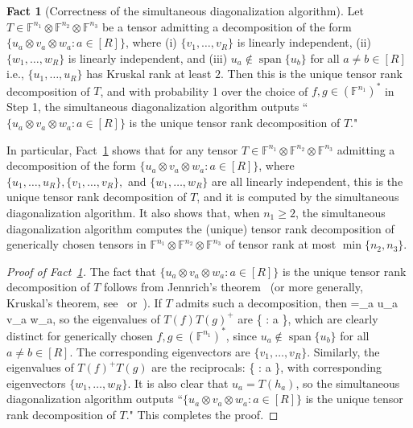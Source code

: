 \documentclass[11pt]{article}
\theoremstyle{definition}
\newtheorem{fact}[theorem]{Fact}
\newcommand{\field}{\mathbb{F}}
\newcommand\A{\mathcal{A}}
\DeclareMathOperator{\spn}{span}
\def\ba#1\ea{\begin{align}#1\end{align}}
\begin{document}
\begin{fact}[Correctness of the simultaneous diagonalization algorithm]\label{fact:jennrich}
Let $T \in \field^{n_1}\otimes \field^{n_2} \otimes \field^{n_3}$ be a tensor admitting a decomposition of the form $\{u_a \otimes v_a \otimes w_a : a \in [R]\}$, where (i) $\{v_1,\dots, v_R\}$ is linearly independent, (ii) $\{w_1,\dots, w_R\}$ is linearly independent, and (iii) $u_a \notin \spn\{u_b\}$ for all $a \neq b \in [R]$ i.e., $\{u_1, \dots, u_R\}$ has Kruskal rank at least $2$. Then this is the unique tensor rank decomposition of $T$, and with probability 1 over the choice of $f,g \in (\field^{n_1})^*$ in Step 1, the simultaneous diagonalization algorithm outputs ``$\{u_a \otimes v_a \otimes w_a : a \in [R]\}$ is the unique tensor rank decomposition of $T$."
\end{fact}
In particular, Fact~\ref{fact:jennrich} shows that for any tensor $T \in \field^{n_1}\otimes \field^{n_2} \otimes \field^{n_3}$ admitting a decomposition of the form $\{u_a \otimes v_a \otimes w_a : a \in [R]\}$, where $\{u_1,\dots, u_R\}, \{v_1,\dots,v_R\},$ and $\{w_1,\dots,w_R\}$ are all linearly independent, this is the unique tensor rank decomposition of $T$, and it is computed by the simultaneous diagonalization algorithm. It also shows that, when $n_1 \geq 2$, the simultaneous diagonalization algorithm computes the (unique) tensor rank decomposition of generically chosen tensors in $\field^{n_1}\otimes \field^{n_2} \otimes \field^{n_3}$ of tensor rank at most $\min\{n_2,n_3\}$.
\begin{proof}[Proof of Fact~\ref{fact:jennrich}]
The fact that $\{u_a \otimes v_a \otimes w_a : a \in [R]\}$ is the unique tensor rank decomposition of $T$ follows from Jennrich's theorem~\cite{harshman1970foundations, Har72} (or more generally, Kruskal's theorem, see~\cite{kruskal1977three} or~\cite{tensor}). If $T$ admits such a decomposition, then
\ba
T=\sum_{a\in [R]} u_a \otimes v_a \otimes w_a,
\ea
so the eigenvalues of $T(f) T(g)^{+}$ are
\ba
\Big\{ : a \in [R]\Big\},
\ea
which are clearly distinct for generically chosen $f,g \in (\field^{n_1})^*$, since $u_a \notin \spn\{u_b\}$ for all $a \neq b \in [R]$. The corresponding eigenvectors are $\{v_1,\dots, v_R\}$. Similarly, the eigenvalues of $T(f)^+ T(g)$ are the reciprocals:
\ba
\Big\{ : a \in [R]\Big\},
\ea
with corresponding eigenvectors $\{w_1,\dots, w_R\}$. It is also clear that $u_a=T(h_a)$, so the simultaneous diagonalization algorithm outputs ``$\{u_a \otimes v_a \otimes w_a : a \in [R]\}$ is the unique tensor rank decomposition of $T$." This completes the proof.
\end{proof}
\end{document}
